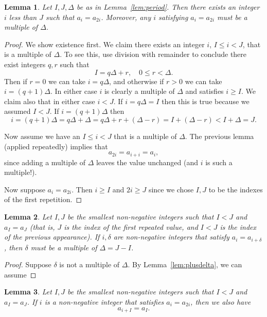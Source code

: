 \documentclass[11pt]{article}
\newtheorem{lemma}{Lemma}
\begin{document}
\begin{lemma}
    Let $I,J,\Delta$ be as in Lemma~\ref{lem:period}. 
    Then there exists an integer $i$ less than $J$ such that $a_i=a_{2i}$.
    Moreover, any $i$ satisfying $a_i=a_{2i}$ must be a multiple of
    $\Delta$.
\end{lemma}
\begin{proof}
    We show existence first.
    We claim there exists an
    integer $i$, $I\leq i < J$, that is a multiple of $\Delta$. To see
    this, use division with remainder to conclude there exist integers
    $q,r$ such that
    \[
        I = q\Delta + r, \quad 0\leq r < \Delta.
    \]
    Then if $r=0$ we can take $i = q\Delta$, and otherwise if $r>0$ we can take
    $i=(q+1)\Delta$. In either case $i$ is clearly a multiple of $\Delta$ and
    satisfies $i\geq I$.  We
    claim also that in either case $i<J$. If $i=q\Delta = I$ then this
    is true because we assumed $I<J$. If $i=(q+1)\Delta$ then
    \[
        i = (q+1)\Delta = q\Delta + \Delta = q\Delta + r + (\Delta-r) 
        = I + (\Delta - r) < I + \Delta = J.
    \]

    Now assume we have an $I\leq i<J$ that is a multiple of $\Delta$.
    The previous lemma 
    (applied repeatedly) implies that
    \[
        a_{2i} = a_{i+i} = a_i,
    \]
    since adding a multiple of $\Delta$ leaves the value unchanged (and
    $i$ is such a multiple!).

    Now suppose $a_i=a_{2i}$. Then $i\geq I$ and $2i\geq J$ since we
    chose $I,J$ to be the indexes of the first repetition.
\end{proof}

\begin{lemma}
    Let $I,J$ be the smallest non-negative integers such that $I<J$ and $a_I =
    a_J$ (that is, $J$ is the index of the first repeated value, and $I<J$ is
    the index of the previous appearance).  If $i,\delta$ are non-negative
    integers that satisfy $a_i = a_{i+\delta}$, then $\delta$ must be a
    multiple of $\Delta = J-I$.
\end{lemma}
\begin{proof}
    Suppose $\delta$ is not a multiple of $\Delta$.
    By Lemma~\ref{lem:plusdelta}, we can assume
\end{proof}

\begin{lemma}
    Let $I,J$ be the smallest non-negative integers such that $I<J$ and $a_I =
    a_J$.  
    If $i$ is a non-negative integer that satisfies $a_i = a_{2i}$, then we
    also have
    \[
        a_{i+I} = a_I.
    \]
\end{lemma}
\end{document}
